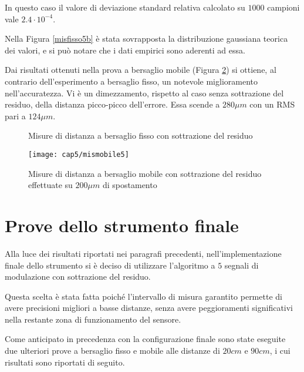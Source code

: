In questo caso il valore di deviazione standard relativa calcolato su $1000$ campioni vale $2.4 \cdot 10^{-4}$.

Nella Figura \ref{misfisso5b} è stata sovrapposta la distribuzione gaussiana teorica dei valori, e si può notare che i dati empirici sono aderenti ad essa.

Dai risultati ottenuti nella prova a bersaglio mobile (Figura \ref{mismobile5}) si ottiene, al contrario dell'esperimento a bersaglio fisso, un notevole miglioramento nell'accuratezza. Vi è un dimezzamento, rispetto al caso senza sottrazione del residuo, della distanza picco-picco dell'errore. Essa scende a $280 \mu m$ con un RMS pari a $124 \mu m$.
\begin{figure}[H]
	\centering
\end{figure}
\begin{figure}[H]
	\centering
	\caption{Misure di distanza a bersaglio fisso con sottrazione del residuo}\label{misfisso5}
\end{figure}
\begin{figure}[H] 
	\begin{center}
		\texttt{[image: cap5/mismobile5]}
		\caption{Misure di distanza a bersaglio mobile con sottrazione del residuo effettuate su $200 \mu m$ di spostamento}
		\label{mismobile5}
	\end{center}
\end{figure}

\section{Prove dello strumento finale}
Alla luce dei risultati riportati nei paragrafi precedenti, nell'implementazione finale dello strumento si è deciso di utilizzare l'algoritmo a $5$ segnali di modulazione con sottrazione del residuo.

Questa scelta è stata fatta poiché l'intervallo di misura garantito permette di avere precisioni migliori a basse distanze, senza avere peggioramenti significativi nella restante zona di funzionamento del sensore.

Come anticipato in precedenza con la configurazione finale sono state eseguite due ulteriori prove a bersaglio fisso e mobile alle distanze di $20cm$ e $90cm$, i cui risultati sono riportati di seguito.

